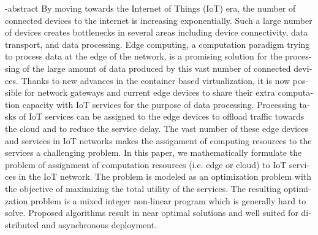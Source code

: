 

\begin{latin}
  
  
  \en-abstract{
    By moving towards the Internet of Things (IoT) era, the number of connected devices to the internet is increasing exponentially.
    Such a large number of devices creates bottlenecks in several areas including device connectivity, data transport, and data processing.
    Edge computing, a computation paradigm trying to process data at the edge of the network, is a promising solution for the processing of the large amount of data produced by this vast number of connected devices.
    Thanks to new advances in the container based virtualization, it is now possible for network gateways and current edge devices to share their extra computation capacity with IoT services for the purpose of data processing.
    Processing tasks of IoT services can be assigned to the edge devices to offload traffic towards the cloud and to reduce the service delay.
    The vast number of these edge devices and services in IoT networks makes the assignment of computing resources to the services a challenging problem.
    In this paper, we mathematically formulate the problem of assignment of computation resources (i.e. edge or cloud) to IoT services in the IoT network.
    The problem is modeled as an optimization problem with the objective of maximizing the total utility of the services.
    The resulting optimization problem is a mixed integer non-linear program which is generally hard to solve.
    Proposed algorithms result in near optimal solutions and well suited for distributed and asynchronous deployment.
  }

  \cleartoleftpage
  \latinabstractPage
  \cleartoleftpage
  \latinfirstPage
\end{latin}
